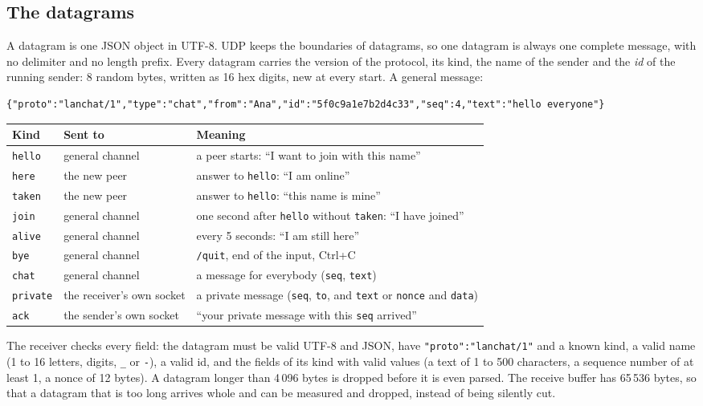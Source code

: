 \documentclass[11pt,a4paper]{article}
\newcommand{\code}[1]{{\frenchspacing\texttt{#1}}}
\begin{document}
\subsection{The datagrams}

A datagram is one JSON object in UTF-8. UDP keeps the boundaries of datagrams, so one datagram is
always one complete message, with no delimiter and no length prefix. Every datagram carries the
version of the protocol, its kind, the name of the sender and the \emph{id} of the running sender:
8 random bytes, written as 16 hex digits, new at every start. A general message:

\begin{lstlisting}
{"proto":"lanchat/1","type":"chat","from":"Ana","id":"5f0c9a1e7b2d4c33","seq":4,"text":"hello everyone"}
\end{lstlisting}

\begin{center}
\small
\begin{tabularx}{\linewidth}{@{}llX@{}}
\toprule
Kind & Sent to & Meaning \\
\midrule
\code{hello} & general channel & a peer starts: ``I want to join with this name'' \\
\code{here}  & the new peer & answer to \code{hello}: ``I am online'' \\
\code{taken} & the new peer & answer to \code{hello}: ``this name is mine'' \\
\code{join}  & general channel & one second after \code{hello} without \code{taken}: ``I have joined'' \\
\code{alive} & general channel & every 5 seconds: ``I am still here'' \\
\code{bye}   & general channel & \code{/quit}, end of the input, Ctrl+C \\
\code{chat}  & general channel & a message for everybody (\code{seq}, \code{text}) \\
\code{private} & the receiver's own socket & a private message (\code{seq}, \code{to}, and \code{text} or \code{nonce} and \code{data}) \\
\code{ack}   & the sender's own socket & ``your private message with this \code{seq} arrived'' \\
\bottomrule
\end{tabularx}
\end{center}

The receiver checks every field: the datagram must be valid UTF-8 and JSON, have
\code{"proto":"lanchat/1"} and a known kind, a valid name (1 to 16 letters, digits, \code{\_} or
\code{-}), a valid id, and the fields of its kind with valid values (a text of 1 to 500 characters,
a sequence number of at least 1, a nonce of 12 bytes). A datagram longer than 4\,096 bytes is
dropped before it is even parsed. The receive buffer has 65\,536 bytes, so that a datagram that is
too long arrives whole and can be measured and dropped, instead of being silently cut.
\end{document}
